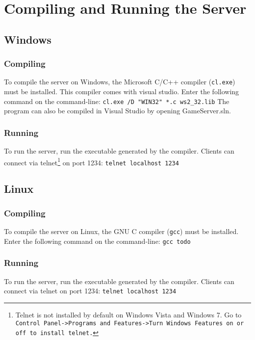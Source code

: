 \documentclass{article}
\begin{document}
\section{Compiling and Running the Server}

\subsection{Windows}

\subsubsection*{Compiling}
To compile the server on Windows, the Microsoft C/C++ compiler (\texttt{cl.exe}) must be installed. This compiler comes with visual studio. Enter the following command on the command-line:\newline\newline
\texttt{cl.exe /D "WIN32" *.c ws2\_32.lib}\newline\newline
The program can also be compiled in Visual Studio by opening GameServer.sln.
\subsubsection*{Running}
To run the server, run the executable generated by the compiler. Clients can connect via telnet\footnote{Telnet is not installed by default on Windows Vista and Windows 7. Go to \texttt{Control Panel->Programs and Features->Turn Windows Features on or off to install telnet.}} on port 1234:
\newline\newline
\texttt{telnet localhost 1234}

\subsection{Linux}

\subsubsection*{Compiling}
To compile the server on Linux, the GNU C compiler (\texttt{gcc}) must be installed. Enter the following command on the command-line:\newline\newline
\texttt{gcc todo}
\subsubsection*{Running}
To run the server, run the executable generated by the compiler. Clients can connect via telnet on port 1234:\newline\newline
\texttt{telnet localhost 1234}
\end{document}
